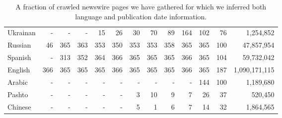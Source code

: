 \documentclass{article}
\begin{document}
\begin{table}[h!]
\begin{center}
\begin{tabular}{l|rrrrrrrrrrr|r}
Ukrainan	&	-	&	-	&	-	&	15	&	26	&	30	&	70	&	89	&	164	&	102	&	76	&	1,254,852\\
Russian	&	46	&	365	&	363	&	353	&	350	&	353	&	353	&	358	&	365	&	365	&	100	&	47,857,954\\
Spanish	&	-	&	313	&	352	&	364	&	366	&	365	&	365	&	365	&	366	&	365	&	104	&	59,732,042\\
English	&	366	&	365	&	365	&	365	&	366	&	365	&	365	&	365	&	366	&	365	&	187	&	1,090,171,115\\
Arabic	&	-	&	-	&	-	&	-	&	-	&	-	&	-	&	-	&	-	&	144	&	100	&	1,189,680\\
Pashto	&	-	&	-	&	-	&	-	&	-	&	3	&	10	&	9	&	7	&	26	&	37	&	520,450\\
Chinese	&	-	&	-	&	-	&	-	&	-	&	5	&	1	&	6	&	7	&	14	&	32	&	1,864,565\\
\end{tabular}
\end{center}
\normalsize
\caption{A fraction of crawled newswire pages we have gathered for which we inferred both language and publication date information.}
\label{fig:newsstats}
\end{table}
\end{document}
